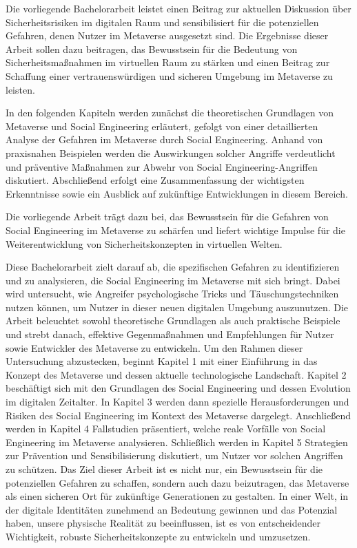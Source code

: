 Die vorliegende Bachelorarbeit leistet einen Beitrag zur aktuellen Diskussion über Sicherheitsrisiken im digitalen Raum und sensibilisiert für die potenziellen Gefahren, denen Nutzer im Metaverse ausgesetzt sind. Die Ergebnisse dieser Arbeit sollen dazu beitragen, das Bewusstsein für die Bedeutung von Sicherheitsmaßnahmen im virtuellen Raum zu stärken und einen Beitrag zur Schaffung einer vertrauenswürdigen und sicheren Umgebung im Metaverse zu leisten.

In den folgenden Kapiteln werden zunächst die theoretischen Grundlagen von Metaverse und Social Engineering erläutert, gefolgt von einer detaillierten Analyse der Gefahren im Metaverse durch Social Engineering. Anhand von praxisnahen Beispielen werden die Auswirkungen solcher Angriffe verdeutlicht und präventive Maßnahmen zur Abwehr von Social Engineering-Angriffen diskutiert. Abschließend erfolgt eine Zusammenfassung der wichtigsten Erkenntnisse sowie ein Ausblick auf zukünftige Entwicklungen in diesem Bereich.


Die vorliegende Arbeit trägt dazu bei, das Bewusstsein für die Gefahren von Social Engineering im Metaverse zu schärfen und liefert wichtige Impulse für die Weiterentwicklung von Sicherheitskonzepten in virtuellen Welten.


Diese Bachelorarbeit zielt darauf ab, die spezifischen Gefahren zu identifizieren und zu analysieren, die Social Engineering im Metaverse mit sich bringt. Dabei wird untersucht, wie Angreifer psychologische Tricks und Täuschungstechniken nutzen können, um Nutzer in dieser neuen digitalen Umgebung auszunutzen. Die Arbeit beleuchtet sowohl theoretische Grundlagen als auch praktische Beispiele und strebt danach, effektive Gegenmaßnahmen und Empfehlungen für Nutzer sowie Entwickler des Metaverse zu entwickeln.
Um den Rahmen dieser Untersuchung abzustecken, beginnt Kapitel 1 mit einer Einführung in das Konzept des Metaverse und dessen aktuelle technologische Landschaft. Kapitel 2 beschäftigt sich mit den Grundlagen des Social Engineering und dessen Evolution im digitalen Zeitalter. In Kapitel 3 werden dann spezielle Herausforderungen und Risiken des Social Engineering im Kontext des Metaverse dargelegt. Anschließend werden in Kapitel 4 Fallstudien präsentiert, welche reale Vorfälle von Social Engineering im Metaverse analysieren. Schließlich werden in Kapitel 5 Strategien zur Prävention und Sensibilisierung diskutiert, um Nutzer vor solchen Angriffen zu schützen.
Das Ziel dieser Arbeit ist es nicht nur, ein Bewusstsein für die potenziellen Gefahren zu schaffen, sondern auch dazu beizutragen, das Metaverse als einen sicheren Ort für zukünftige Generationen zu gestalten. In einer Welt, in der digitale Identitäten zunehmend an Bedeutung gewinnen und das Potenzial haben, unsere physische Realität zu beeinflussen, ist es von entscheidender Wichtigkeit, robuste Sicherheitskonzepte zu entwickeln und umzusetzen.


